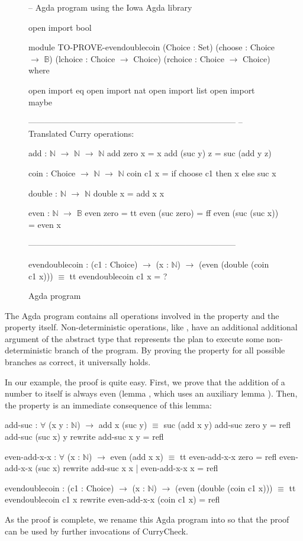 \begin{figure}[t]
\begin{curry}
-- Agda program using the Iowa Agda library

open import bool

module TO-PROVE-evendoublecoin
  (Choice : Set)
  (choose : Choice $\to$ ${\mathbb B}$)
  (lchoice : Choice $\to$ Choice)
  (rchoice : Choice $\to$ Choice)
  where

open import eq
open import nat
open import list
open import maybe

---------------------------------------------------------------------------
-- Translated Curry operations:

add : ${\mathbb N}$ $\to$ ${\mathbb N}$ $\to$ ${\mathbb N}$
add zero x = x
add (suc y) z = suc (add y z)

coin : Choice $\to$ ${\mathbb N}$ $\to$ ${\mathbb N}$
coin c1 x = if choose c1 then x else suc x

double : ${\mathbb N}$ $\to$ ${\mathbb N}$
double x = add x x

even : ${\mathbb N}$ $\to$ ${\mathbb B}$
even zero = tt
even (suc zero) = ff
even (suc (suc x)) = even x

---------------------------------------------------------------------------

evendoublecoin : (c1 : Choice) $\to$ (x : ${\mathbb N}$) $\to$ (even (double (coin c1 x))) $\equiv$ tt
evendoublecoin c1 x = ?

\end{curry}
\caption{Agda program \label{fig:to-prove-evendoublecoin}}
\end{figure}

The Agda program contains all operations involved in the property
and the property itself.
Non-deterministic operations, like , have an additional
additional argument of the abstract type 
that represents the plan to execute some non-deterministic branch
of the program. By proving the property for all possible branches
as correct, it universally holds.

In our example, the proof is quite easy. First, we prove
that the addition of a number to itself is always even
(lemma , which uses an auxiliary lemma
). Then, the property is an immediate consequence
of this lemma:
%
\begin{curry}
add-suc : $\forall$ (x y : ${\mathbb N}$) $\to$ add x (suc y) $\equiv$ suc (add x y)
add-suc zero    y = refl
add-suc (suc x) y rewrite add-suc x y = refl

even-add-x-x : $\forall$ (x : ${\mathbb N}$) $\to$ even (add x x) $\equiv$ tt
even-add-x-x zero    = refl
even-add-x-x (suc x) rewrite add-suc x x | even-add-x-x x = refl

evendoublecoin : (c1 : Choice) $\to$ (x : ${\mathbb N}$) $\to$ (even (double (coin c1 x))) $\equiv$ tt
evendoublecoin c1 x rewrite even-add-x-x (coin c1 x) = refl
\end{curry}
%
As the proof is complete, we rename this Agda program
into  so that the proof
can be used by further invocations of CurryCheck.


